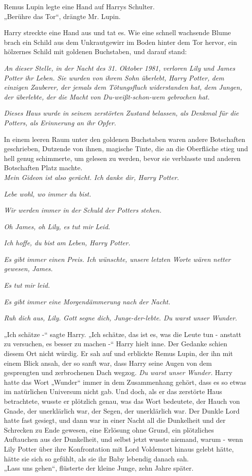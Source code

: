 {Remus Lupin legte eine Hand auf Harrys Schulter.\\ „Berühre das Tor“, drängte Mr. Lupin.

Harry streckte eine Hand aus und tat es. Wie eine schnell wachsende Blume brach ein Schild aus dem Unkrautgewirr im Boden hinter dem Tor hervor, ein hölzernes Schild mit goldenen Buchstaben, und darauf stand:

\emph{An dieser Stelle, in der Nacht des 31. Oktober 1981, verloren Lily und James Potter ihr Leben. Sie wurden von ihrem Sohn überlebt, Harry Potter, dem einzigen Zauberer, der jemals dem Tötungsfluch widerstanden hat, dem Jungen, der überlebte, der die Macht von Du-weißt-schon-wem gebrochen hat.}

\hfill\break

\emph{Dieses Haus wurde in seinem zerstörten Zustand belassen, als Denkmal für die Potters, als Erinnerung an ihr Opfer.}

In einem leeren Raum unter den goldenen Buchstaben waren andere Botschaften geschrieben, Dutzende von ihnen, magische Tinte, die an die Oberfläche stieg und hell genug schimmerte, um gelesen zu werden, bevor sie verblasste und anderen Botschaften Platz machte.\\ \emph{Mein Gideon ist also gerächt. Ich danke dir, Harry Potter.}

\emph{Lebe wohl, wo immer du bist.}

\emph{Wir werden immer in der Schuld der Potters stehen.}

\emph{Oh James, oh Lily, es tut mir Leid.}

\emph{Ich hoffe, du bist am Leben, Harry Potter.}

\emph{Es gibt immer einen Preis. Ich wünschte, unsere letzten Worte wären netter gewesen, James.}

\emph{Es tut mir leid.}

\emph{Es gibt immer eine Morgendämmerung nach der Nacht.}

\emph{Ruh dich aus, Lily. Gott segne dich, Junge-der-lebte. Du warst unser Wunder.}

„Ich schätze -“ sagte Harry. „Ich schätze, das ist es, was die Leute tun - anstatt zu versuchen, es besser zu machen -“ Harry hielt inne. Der Gedanke schien diesem Ort nicht würdig. Er sah auf und erblickte Remus Lupin, der ihn mit einem Blick ansah, der so sanft war, dass Harry seine Augen von dem gesprengten und zerbrochenen Dach wegzog. \emph{Du warst unser Wunder.} Harry hatte das Wort „Wunder“ immer in dem Zusammenhang gehört, dass es so etwas im natürlichen Universum nicht gab. Und doch, als er das zerstörte Haus betrachtete, wusste er plötzlich genau, was das Wort bedeutete, der Hauch von Gnade, der unerklärlich war, der Segen, der unerklärlich war. Der Dunkle Lord hatte fast gesiegt, und dann war in einer Nacht all die Dunkelheit und der Schrecken zu Ende gewesen, eine Erlösung ohne Grund, ein plötzliches Auftauchen aus der Dunkelheit, und selbst jetzt wusste niemand, warum - wenn Lily Potter über ihre Konfrontation mit Lord Voldemort hinaus gelebt hätte, hätte sie sich so gefühlt, als sie ihr Baby lebendig danach sah.\\ „Lass uns gehen“, flüsterte der kleine Junge, zehn Jahre später.

}
